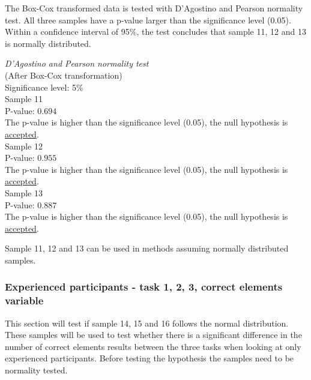 The Box-Cox transformed data is tested with D'Agostino and Pearson normality test. All three samples have a p-value larger than the significance level (0.05). Within a confidence interval of 95\%, the test concludes that sample 11, 12 and 13 is normally distributed.\\[0.2cm]

 \begin{center}
	\begin{tcolorbox}[width=0.80\textwidth]
		\centering
		\textit{D'Agostino and Pearson normality test}\\
		(After Box-Cox transformation) \\
		Significance level: 5\%  \\[0.5cm]
		
		Sample 11 \\
		P-value: $0.694$\\
		The p-value is higher than the significance level (0.05), the null hypothesis is \underline{accepted}. \\[0.5cm]
		
		Sample 12 \\
		P-value: $0.955$ \\
		The p-value is higher than the significance level (0.05), the null hypothesis is \underline{accepted}. \\[0.5cm]
		
		Sample 13 \\
		P-value: $0.887$ \\
		The p-value is higher than the significance level (0.05), the null hypothesis is \underline{accepted}. \\[0.5cm]
	\end{tcolorbox} 
\end{center}
\vspace{0.3cm}

Sample 11, 12 and 13 can be used in methods assuming normally distributed samples. 

\subsubsection[Sample 14, 15 and 16]{Experienced participants - task 1, 2, 3, correct elements variable}
This section will test if sample 14, 15 and 16 follows the normal distribution. These samples will be used to test whether there is a significant difference in the number of correct elements results between the three tasks when looking at only experienced participants. Before testing the hypothesis the samples need to be normality tested. 


